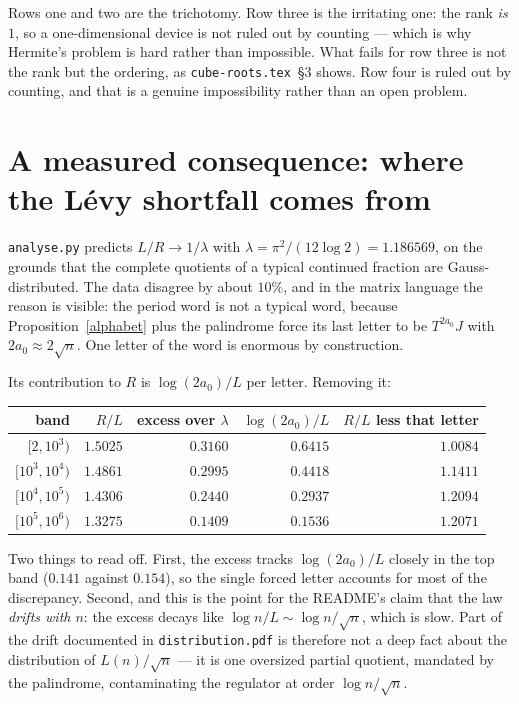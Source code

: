 \documentclass[12pt,a4paper]{article}
\theoremstyle{plain}
\theoremstyle{definition}
\begin{document}
Rows one and two are the trichotomy. Row three is the irritating one: the rank \emph{is} $1$, so a one-dimensional device is not ruled out by counting --- which is why Hermite's problem is hard rather than impossible. What fails for row three is not the rank but the ordering, as \texttt{cube-roots.tex}~\S3 shows. Row four is ruled out by counting, and that is a genuine impossibility rather than an open problem.

\section{A measured consequence: where the L\'evy shortfall comes from}

\texttt{analyse.py} predicts $L/R \to 1/\lambda$ with $\lambda = \pi^2/(12\log 2) = 1.186569$, on the grounds that the complete quotients of a typical continued fraction are Gauss-distributed. The data disagree by about $10\%$, and in the matrix language the reason is visible: the period word is not a typical word, because Proposition~\ref{alphabet} plus the palindrome force its last letter to be $T^{2a_0}J$ with $2a_0 \approx 2\sqrt n$. One letter of the word is enormous by construction.

Its contribution to $R$ is $\log(2a_0)/L$ per letter. Removing it:

\begin{center}
\begin{tabular}{rrrrr}
\toprule
band & $R/L$ & excess over $\lambda$ & $\log(2a_0)/L$ & $R/L$ less that letter \\
\midrule
$[2,10^3)$        & $1.5025$ & $0.3160$ & $0.6415$ & $1.0084$ \\
$[10^3,10^4)$     & $1.4861$ & $0.2995$ & $0.4418$ & $1.1411$ \\
$[10^4,10^5)$     & $1.4306$ & $0.2440$ & $0.2937$ & $1.2094$ \\
$[10^5,10^6)$     & $1.3275$ & $0.1409$ & $0.1536$ & $1.2071$ \\
\bottomrule
\end{tabular}
\end{center}

Two things to read off. First, the excess tracks $\log(2a_0)/L$ closely in the top band ($0.141$ against $0.154$), so the single forced letter accounts for most of the discrepancy. Second, and this is the point for the README's claim that the law \emph{drifts with $n$}: the excess decays like $\log n / L \sim \log n/\sqrt n$, which is slow. Part of the drift documented in \texttt{distribution.pdf} is therefore not a deep fact about the distribution of $L(n)/\sqrt n$ --- it is one oversized partial quotient, mandated by the palindrome, contaminating the regulator at order $\log n/\sqrt n$.
\end{document}
